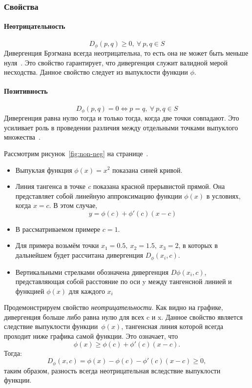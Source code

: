 \documentclass[12pt]{scrartcl}
\begin{document}
\subsubsection{Свойства}
\paragraph{Неотрицательность}\label{par:non-negativity}
\begin{equation}
    D_\phi(p,q) \geq 0,\ \forall \ p,q \in S
\end{equation}
Дивергенция Брэгмана всегда неотрицательна, то есть она не может быть меньше нуля~\cite{Dhillon2008}. Это свойство гарантирует, что дивергенция служит валидной мерой несходства. Данное свойство следует из выпуклости функции $\phi$.
\paragraph{Позитивность}\label{par:positivity}
\begin{equation}
    D_\phi(p,q) = 0 \Longleftrightarrow p = q, \ \forall \ p,q \in S
\end{equation}
Дивергенция равна нулю тогда и только тогда, когда две точки совпадают. Это усиливает роль в проведении различия между отдельными точками выпуклого множества~\cite{Nielsen2021}.

Рассмотрим рисунок~\ref{fig:non-neg} на странице~\pageref{fig:non-neg}.
\begin{itemize}
    \item Выпуклая функция $\phi(x) = x^{2}$ показана синей кривой.
    \item Линия тангенса в точке \emph{c} показана красной прерывистой прямой. Она представляет собой линейную аппроксимацию функции $\phi(x)$ в условиях, когда $x = c$. В этом случае,
    \begin{equation}
        y = \phi(c) + \phi'(c) (x-c)
    \end{equation}
    \item В рассматриваемом примере $c = 1$.
    \item Для примера возьмём точки $x_{1} = 0.5,\ x_{2} = 1.5,\ x_{3} = 2$, в которых в дальнейшем будет рассчитана дивергенция $D_{\phi} (x_{i},c)$.
    \item Вертикальными стрелками обозначена дивергенция $D\phi(x_{i},c)$, представляющая собой расстояние по оси y между тангенсной линией и функцией $\phi(x)$ для каждого $x_{i}$
\end{itemize}
Продемонстрируем свойство \emph{неотрицательности}. Как видно на графике, дивергенция больше либо равна нулю для всех c и x. Данное свойство является следствие выпуклости функции~$\phi(x)$, тангенсная линия которой всегда проходит ниже графика самой функции. Это означает, что
\begin{equation}
    \phi(x) \geq \phi(c) + \phi'(c)(x-c).
\end{equation}
Тогда:
\begin{equation}
    D_\phi (x,c) = \phi(x) - \phi (c) - \phi'(c)(x-c) \geq 0,
\end{equation}
таким образом, разность всегда неотрицательная вследствие выпуклости функции.
\end{document}
